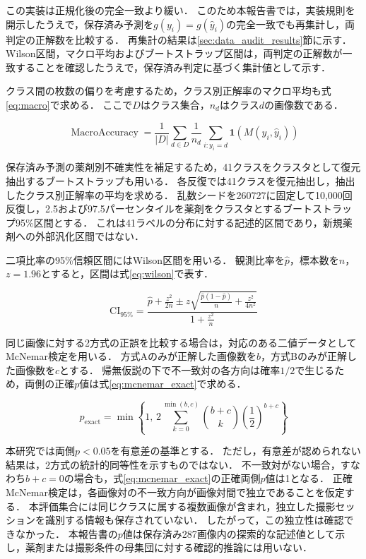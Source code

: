 \documentclass[uplatex,dvipdfmx]{jsarticle}
\begin{document}
この実装は正規化後の完全一致より緩い．
このため本報告書では，実装規則を開示したうえで，保存済み予測を$g(y_i)=g(\hat{y}_i)$の完全一致でも再集計し，両判定の正解数を比較する．
再集計の結果は\ref{sec:data_audit_results}節に示す．
Wilson区間，マクロ平均およびブートストラップ区間は，両判定の正解数が一致することを確認したうえで，保存済み判定に基づく集計値として示す．

クラス間の枚数の偏りを考慮するため，クラス別正解率のマクロ平均も式\eqref{eq:macro}で求める．
ここで$D$はクラス集合，$n_d$はクラス$d$の画像数である．

\begin{equation}
  \operatorname{MacroAccuracy}
  =
  \frac{1}{|D|}
  \sum_{d \in D}
  \frac{1}{n_d}
  \sum_{i : y_i = d}
  \mathbf{1}\!\left(M(y_i,\hat{y}_i)\right)
  \label{eq:macro}
\end{equation}

保存済み予測の薬剤別不確実性を補足するため，41クラスをクラスタとして復元抽出するブートストラップも用いる．
各反復では41クラスを復元抽出し，抽出したクラス別正解率の平均を求める．
乱数シードを260727に固定して10,000回反復し，2.5および97.5パーセンタイルを薬剤をクラスタとするブートストラップ95\%区間とする．
これは41ラベルの分布に対する記述的区間であり，新規薬剤への外部汎化区間ではない．

二項比率の95\%信頼区間にはWilson区間を用いる．
観測比率を$\hat{p}$，標本数を$n$，$z=1.96$とすると，区間は式\eqref{eq:wilson}で表す．

\begin{equation}
  \mathrm{CI}_{95\%}
  =
  \frac{
    \hat{p}+\frac{z^2}{2n}
    \pm
    z\sqrt{\frac{\hat{p}(1-\hat{p})}{n}+\frac{z^2}{4n^2}}
  }{
    1+\frac{z^2}{n}
  }
  \label{eq:wilson}
\end{equation}

同じ画像に対する2方式の正誤を比較する場合は，対応のある二値データとしてMcNemar検定を用いる．
方式Aのみが正解した画像数を$b$，方式Bのみが正解した画像数を$c$とする．
帰無仮説の下で不一致対の各方向は確率$1/2$で生じるため，両側の正確$p$値は式\eqref{eq:mcnemar_exact}で求める．

\begin{equation}
  p_{\mathrm{exact}}
  =
  \min\!\left\{
    1,\,
    2\sum_{k=0}^{\min(b,c)}
    \binom{b+c}{k}
    \left(\frac{1}{2}\right)^{b+c}
  \right\}
  \label{eq:mcnemar_exact}
\end{equation}

本研究では両側$p<0.05$を有意差の基準とする．
ただし，有意差が認められない結果は，2方式の統計的同等性を示すものではない．
不一致対がない場合，すなわち$b+c=0$の場合も，式\eqref{eq:mcnemar_exact}の正確両側$p$値は1となる．
正確McNemar検定は，各画像対の不一致方向が画像対間で独立であることを仮定する．
本評価集合には同じクラスに属する複数画像が含まれ，独立した撮影セッションを識別する情報も保存されていない．
したがって，この独立性は確認できなかった．
本報告書の$p$値は保存済み287画像内の探索的な記述値として示し，薬剤または撮影条件の母集団に対する確認的推論には用いない．
\end{document}
